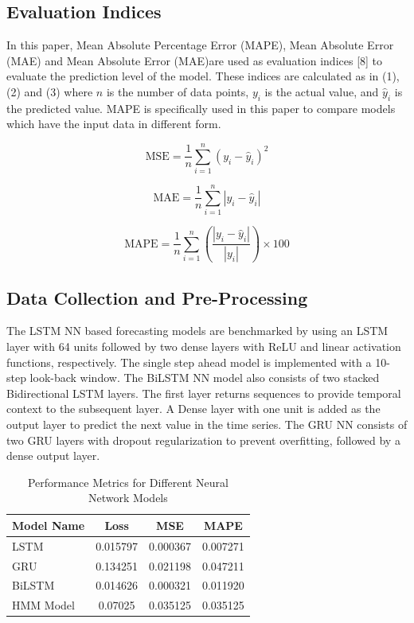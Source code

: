 \documentclass[conference]{IEEEtran}
\begin{document}
\subsection{Evaluation Indices}

In this paper, Mean Absolute Percentage Error (MAPE), Mean Absolute Error (MAE) and Mean Absolute Error (MAE)are used as evaluation indices [8] to evaluate the prediction level of the model. These indices are calculated as in (1), (2) and (3) where $n$ is the number of data points, $y_i$ is the actual value, and $\hat{y}_i$ is the predicted value. MAPE is specifically used in this paper to compare models which have the input data in different form. 

\begin{equation}
\text{MSE} = \frac{1}{n} \sum_{i=1}^{n} (y_i - \hat{y}_i)^2
\end{equation}

\begin{equation}
\text{MAE} = \frac{1}{n} \sum_{i=1}^{n} |y_i - \hat{y}_i|
\end{equation}

\begin{equation}
\text{MAPE} = \frac{1}{n} \sum_{i=1}^{n} \left(\frac{|y_i - \hat{y}_i|}{|y_i|}\right) \times 100
\end{equation}

\subsection{Data Collection and Pre-Processing}

The LSTM NN based forecasting models are benchmarked by using an LSTM layer with 64 units followed by two dense layers with ReLU and linear activation functions, respectively. The single step ahead model is implemented with a 10-step look-back window. The BiLSTM NN model also consists of two stacked Bidirectional LSTM layers. The first layer returns sequences  to provide temporal context to the subsequent layer. A Dense layer with one unit is added as the output layer to predict the next value in the time series. The GRU NN consists of two GRU layers with dropout regularization to prevent overfitting, followed by a dense output layer.

\begin{table}[htbp]
\centering
\caption{Performance Metrics for Different Neural Network Models}
\begin{tabular}{lccc}
\toprule
Model Name & Loss & MSE & MAPE \\
\midrule
LSTM      & 0.015797    & 0.000367    & 0.007271 \\
GRU       & 0.134251    & 0.021198    & 0.047211 \\
BiLSTM    & 0.014626    & 0.000321    & 0.011920 \\
HMM Model & 0.07025     & 0.035125    & 0.035125 \\
\bottomrule
\end{tabular}
\end{table}
\end{document}
